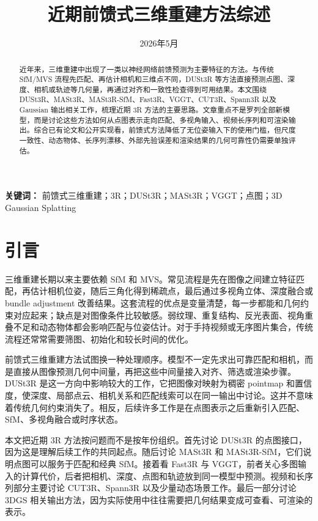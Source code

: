 \documentclass[UTF8,a4paper,zihao=-4,fontset=windows]{ctexart}
\title{\bfseries 近期前馈式三维重建方法综述}
\author{}
\date{2026年5月}
\begin{document}
\maketitle

\begin{abstract}
近年来，三维重建中出现了一类以神经网络前馈预测为主要特征的方法。与传统 SfM/MVS 流程先匹配、再估计相机和三维点不同，DUSt3R 等方法直接预测点图、深度、相机或轨迹等几何量，再通过对齐和一致性检查得到可用结果。本文围绕 DUSt3R、MASt3R、MASt3R-SfM、Fast3R、VGGT、CUT3R、Spann3R 以及 Gaussian 输出相关工作，梳理近期 3R 方法的主要思路。文章重点不是罗列全部新模型，而是讨论这些方法如何从点图表示走向匹配、多视角输入、视频长序列和可渲染输出。综合已有论文和公开实现看，前馈式方法降低了无位姿输入下的使用门槛，但尺度一致性、动态物体、长序列漂移、外部先验误差和渲染结果的几何可靠性仍需要单独评估。
\end{abstract}

\noindent\textbf{关键词：} 前馈式三维重建；3R；DUSt3R；MASt3R；VGGT；点图；3D Gaussian Splatting

\section{引言}

三维重建长期以来主要依赖 SfM 和 MVS。常见流程是先在图像之间建立特征匹配，再估计相机位姿，随后三角化得到稀疏点，最后通过多视角立体、深度融合或 bundle adjustment 改善结果。这套流程的优点是变量清楚，每一步都能和几何约束对应起来；缺点是对图像条件比较敏感。弱纹理、重复结构、反光表面、视角重叠不足和动态物体都会影响匹配与位姿估计。对于手持视频或无序图片集合，传统流程还常常需要筛图、初始化和较长时间的优化。

前馈式三维重建方法试图换一种处理顺序。模型不一定先求出可靠匹配和相机，而是直接从图像预测几何中间量，再把这些中间量接入对齐、筛选或渲染步骤。DUSt3R 是这一方向中影响较大的工作，它把图像对映射为稠密 pointmap 和置信度，使深度、局部点云、相机关系和匹配线索可以在同一输出中讨论\citep{dust3r}。这并不意味着传统几何约束消失了。相反，后续许多工作是在点图表示之后重新引入匹配、SfM、多视角融合或时序状态。

本文把近期 3R 方法按问题而不是按年份组织。首先讨论 DUSt3R 的点图接口，因为这是理解后续工作的共同起点。随后讨论 MASt3R 和 MASt3R-SfM，它们说明点图可以服务于匹配和经典 SfM。接着看 Fast3R 与 VGGT，前者关心多图输入的计算代价，后者把相机、深度、点图和轨迹放到同一模型中预测\citep{mast3r,mast3r_sfm,fast3r,vggt}。视频和长序列部分主要讨论 CUT3R、Spann3R 以及少量动态场景工作\citep{cut3r,spann3r,monst3r,easi3r,raymap3r}。最后一部分讨论 3DGS 相关输出方法，因为实际使用中往往需要把几何结果变成可查看、可渲染的表示\citep{gaussian_splatting_3d,instantsplat,noposplat,splatt3r}。
\end{document}
